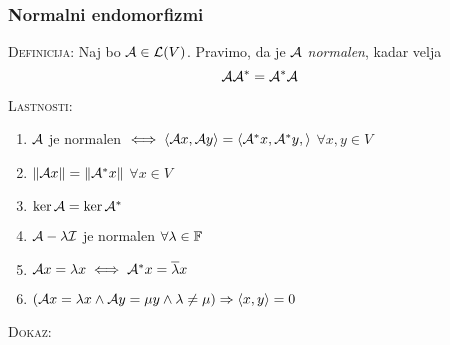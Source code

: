 \subsubsection{Normalni endomorfizmi}
\textsc{Definicija:} Naj bo $\mathcal{A} \in \mathcal{L}(V)$. Pravimo, da je $\mathcal{A}$ \emph{normalen}, kadar velja
\begin{equation*}
\mathcal{A} \mathcal{A}^* = \mathcal{A}^* \mathcal{A}
\end{equation*}

\textsc{Lastnosti:}
\begin{enumerate}
    \item $\mathcal{A}$ je normalen $\iff \langle \mathcal{A} x, \mathcal{A} y \rangle = \langle \mathcal{A}^* x, \mathcal{A}^* y, \rangle$ \hfill $\forall x, y \in V$
    \item $\| \mathcal{A} x \| = \| \mathcal{A}^* x \|$ \hfill $\forall x \in V$
    \item $\ker \mathcal{A} = \ker \mathcal{A}^*$
    \item $\mathcal{A} - \lambda \mathcal{I}$ je normalen \hfill $\forall \lambda \in \operatorname{\mathbb{F}}$
    \item $\mathcal{A} x = \lambda x \iff \mathcal{A}^* x = \overline{\lambda}x$
    \item $(\mathcal{A} x = \lambda x \land \mathcal{A} y = \mu y \land \lambda \neq \mu ) \Rightarrow \langle x, y \rangle = 0$
\end{enumerate}
\textsc{Dokaz:}
